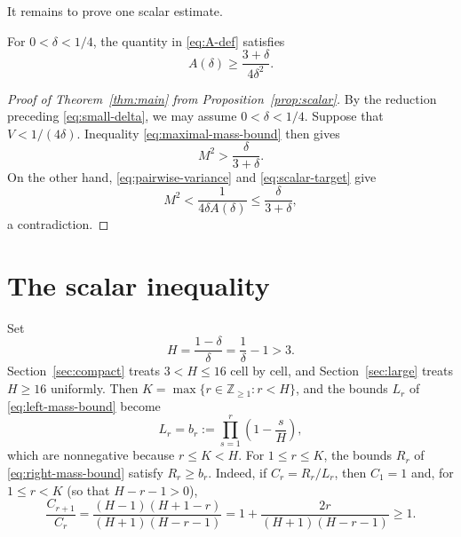 \documentclass[ECP,preprint]{ejpecp}
\begin{document}
It remains to prove one scalar estimate.

\begin{proposition}\label{prop:scalar}
  For $0<\delta<1/4$, the quantity in \eqref{eq:A-def} satisfies
  \begin{equation}\label{eq:scalar-target}
    A(\delta)\geq\frac{3+\delta}{4\delta^2}.
  \end{equation}
\end{proposition}

\begin{proof}[Proof of Theorem~\ref{thm:main} from
  Proposition~\ref{prop:scalar}]
  By the reduction preceding \eqref{eq:small-delta}, we may assume
  $0<\delta<1/4$. Suppose that
  $V<1/(4\delta)$. Inequality \eqref{eq:maximal-mass-bound} then gives
  \[
    M^2>\frac{\delta}{3+\delta}.
  \]
  On the other hand, \eqref{eq:pairwise-variance} and
  \eqref{eq:scalar-target} give
  \[
    M^2<\frac1{4\delta A(\delta)}
    \leq\frac{\delta}{3+\delta},
  \]
  a contradiction.
\end{proof}

\section{The scalar inequality}
\label{sec:scalar}

Set
\begin{equation}\label{eq:H-def}
  H=\frac{1-\delta}{\delta}=\frac1\delta-1>3.
\end{equation}
Section~\ref{sec:compact} treats $3<H\leq16$ cell by cell, and
Section~\ref{sec:large} treats $H\geq16$ uniformly. Then $K=\max\{r\in\mathbb Z_{\geq1}:r<H\}$, and the bounds $L_r$ of
\eqref{eq:left-mass-bound} become
\begin{equation}\label{eq:b-def}
  L_r=b_r:=\prod_{s=1}^r\left(1-\frac{s}{H}\right),
\end{equation}
which are nonnegative because $r\leq K<H$. For $1\leq r\leq K$, the bounds
$R_r$ of \eqref{eq:right-mass-bound} satisfy $R_r\geq b_r$. Indeed, if
$C_r=R_r/L_r$, then $C_1=1$ and, for $1\leq r<K$ (so that $H-r-1>0$),
\begin{equation}\label{eq:C-ratio}
  \frac{C_{r+1}}{C_r}
  =\frac{(H-1)(H+1-r)}{(H+1)(H-r-1)}
  =1+\frac{2r}{(H+1)(H-r-1)}\geq1.
\end{equation}
\end{document}
